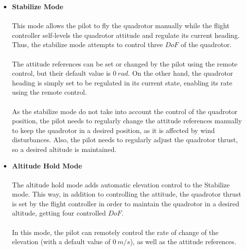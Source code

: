 \begin{itemize}
\item \textbf{Stabilize Mode}\\\\
This mode allows the pilot to fly the quadrotor manually while the flight controller self-levels the quadrotor attitude and regulate its current heading. Thus, the stabilize mode attempts to control three $DoF$ of the quadrotor.\\\\
The attitude references can be set or changed by the pilot using the remote control, but their default value is $0\ rad$. On the other hand, the quadrotor heading is simply set to be regulated in its current state, enabling its rate using the remote control.
\\\\
As the stabilize mode do not take into account the control of the quadrotor position, the pilot needs to regularly change the attitude references manually to keep the quadrotor in a desired position, as it is affected by wind disturbances. Also, the pilot needs to regularly adjust the quadrotor thrust, so a desired altitude is maintained.

\item \textbf{Altitude Hold Mode}\\\\
The altitude hold mode adds automatic elevation control to the Stabilize mode. This way, in addition to controlling the attitude, the quadrotor thrust is set by the flight controller in order to maintain the quadrotor in a desired altitude, getting four controlled $DoF$.
\\\\
In this mode, the pilot can remotely control the rate of change of the elevation (with a default value of $0\ m/s$), as well as the attitude references.


\end{itemize}
